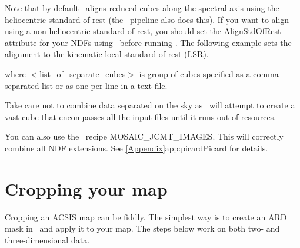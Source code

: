 \documentclass[11pt,oneside,chapters]{starlink}
\providecommand{\att}[1]{\textsf{#1}}
\begin{document}
Note that by default \wcsmosaic\ aligns reduced cubes along the
spectral axis using the heliocentric standard of rest (the \ORACDR\
pipeline also does this).  If you want to align using
a non-heliocentric standard of rest, you should set the
\att{AlignStdOfRest} attribute for your NDFs using \wcsattrib\
before running \wcsmosaic.
The following example sets the alignment to the kinematic local
standard of rest (LSR).

\begin{terminalv}
\end{terminalv}

where $<$list\_of\_separate\_cubes$>$ is group of cubes specified
as a comma-separated list or as one per line in a text file.

\begin{tip}
Take care not to combine data separated on the sky as \wcsmosaic\
will attempt to create a vast cube that encompasses all the input
files until it runs out of resources.
\end{tip}

\begin{tip}
You can also use the \picard\ recipe MOSAIC\_JCMT\_IMAGES. This
will correctly combine all NDF extensions. See
\cref{Appendix}{app:picard}{Picard} for details.
\end{tip}

\newpage
\section{Cropping your map}
\label{sec:collapse}

Cropping an ACSIS map can be fiddly. The simplest way is to create an
ARD mask in \gaia\ and apply it to your map. The steps below work on
both two- and three-dimensional data.
\end{document}
